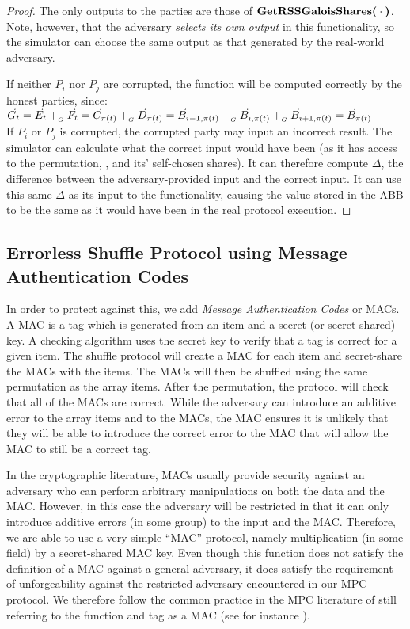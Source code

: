\begin{proof}
	The only outputs to the parties are those of $\textbf{GetRSSGaloisShares(}\cdot\textbf{)}$.
	Note, however, that the adversary \emph{selects its own output}
	in this functionality, so the simulator can choose the same output
	as that generated by the real-world adversary.

	If neither $P_i$ nor $P_j$ are corrupted,
	the function will be computed correctly by the honest parties,
	since:\\ 
	$\vec{G}_t = \vec{E}_t +_{_G} \vec{F}_t
			= \vec{C}_{\pi(t)} +_{_G} \vec{D}_{\pi(t)}
			= \vec{B}_{i-1, \pi(t)} +_{_G} \vec{B}_{i, \pi(t)} +_{_G} \vec{B}_{i+1, \pi(t)}
			= \vec{B}_{\pi(t)}$ \\
	
	If $P_i$ or $P_j$ is corrupted,
	the corrupted party may input an incorrect result.
	The simulator can calculate what the correct input would have been
	(as it has access to the permutation, ,
	and its' self-chosen shares).
	It can therefore compute $\Delta$, the difference between the adversary-provided
	input and the correct input. 
	It can use this same $\Delta$ as its input to the \PairShuffle{}{} functionality,
	causing the value stored in the ABB to be the same as it would have been
	in the real protocol execution.
\end{proof}



\subsection{Errorless Shuffle Protocol using Message Authentication Codes}

In order to protect against this, we add \emph{Message Authentication Codes}
or MACs.
A MAC is a tag which is generated from an item and a secret (or secret-shared) key.
A checking algorithm uses the secret key to verify that a tag is correct for a given item.
The shuffle protocol will create a MAC for each item
and secret-share the MACs with the items.
The MACs will then be shuffled using the same permutation as the array items.
After the permutation, the protocol will check that all of the MACs are correct.
While the adversary can introduce an additive error to the array items and to the MACs,
the MAC ensures it is unlikely that they will be able to introduce the
correct error to the MAC that will allow the MAC to still be a correct tag.

In the cryptographic literature, MACs usually provide security
against an adversary who can perform arbitrary manipulations on 
both the data and the MAC.
However, in this case the adversary will be restricted in that it can only
introduce additive errors (in some group) to the input and the MAC.
Therefore, we are able to use a very simple ``MAC'' protocol,
namely multiplication (in some field) by a secret-shared MAC key.
Even though this function does not satisfy the definition of a MAC against a 
general adversary,
it does satisfy the requirement of unforgeability against the restricted
adversary encountered in our MPC protocol.
We therefore follow the common practice in the MPC literature of still
referring to the function and tag as a MAC
(see for instance \cite{C:DPSZ12}). 

